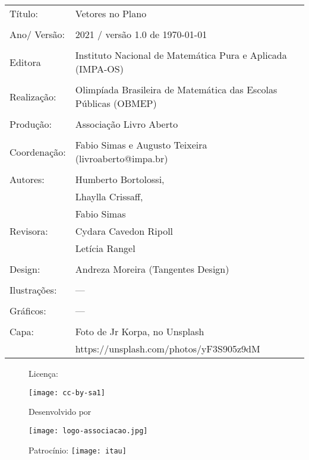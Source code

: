 \begin{tabular}{p{}p{}}
Título: & Vetores no Plano \\
\\
Ano/ Versão: & 2021 / versão 1.0 de \today\\
\\
Editora & Instituto Nacional de Matem\'atica Pura e Aplicada (IMPA-OS)\\
\\
Realização:& Olimp\'iada Brasileira de Matem\'atica das Escolas P\'ublicas (OBMEP)\\
\\
Produção:& Associação Livro Aberto\\
\\
Coordenação: & Fabio Simas e Augusto Teixeira (livroaberto@impa.br)\\
\\
  Autores: & Humberto Bortolossi,\\
        & Lhaylla Crissaff,\\
        & Fabio Simas
\\
Revisora: &  Cydara Cavedon Ripoll  \\
          &  Letícia Rangel \\ 
\\
Design: & Andreza Moreira (Tangentes Design) \\
\\
  Ilustrações: & --- \\ 
\\
Gráficos: & --- \\
\\
  Capa: & Foto de Jr Korpa, no Unsplash \\
        & https://unsplash.com/photos/yF3S905z9dM \\

\end{tabular}

\begin{figure}[b]
\begin{minipage}[l]{5cm}
\centering

{\large Licença:}

  \texttt{[image: cc-by-sa1]}
\end{minipage}\hfill
\begin{minipage}[c]{5cm}
\centering
{\large Desenvolvido por}

\texttt{[image: logo-associacao.jpg]}
\end{minipage}
\begin{minipage}[r]{5cm}
\centering

{\large Patrocínio:}
  \vspace{1em}
  \texttt{[image: itau]}
\end{minipage}
\end{figure}

